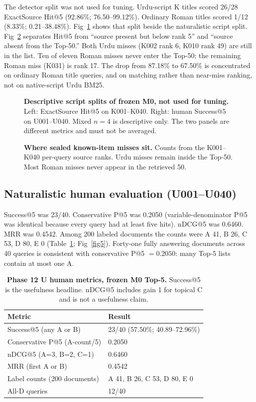 \documentclass[10pt,letterpaper]{article}
\begin{document}
The detector split was not used for tuning. Urdu-script K titles scored 26/28 ExactSource Hit@5 (92.86\%; 76.50--99.12\%). Ordinary Roman titles scored 1/12 (8.33\%; 0.21--38.48\%). Fig~\ref{fig3} shows that split beside the naturalistic script split. Fig~\ref{fig4} separates Hit@5 from ``source present but below rank 5'' and ``source absent from the Top-50.'' Both Urdu misses (K002 rank 6, K010 rank 49) are still in the list. Ten of eleven Roman misses never enter the Top-50; the remaining Roman miss (K031) is rank 17. The drop from 87.18\% to 67.50\% is concentrated on ordinary Roman title queries, and on matching rather than near-miss ranking, not on native-script Urdu BM25.

\begin{figure}[!h]
\caption{\textbf{Descriptive script splits of frozen M0, not used for tuning.} Left: ExactSource Hit@5 on K001--K040. Right: human Success@5 on U001--U040. Mixed $n = 4$ is descriptive only. The two panels are different metrics and must not be averaged.}
\label{fig3}
\end{figure}

\begin{figure}[!h]
\caption{\textbf{Where sealed known-item misses sit.} Counts from the K001--K040 per-query source ranks. Urdu misses remain inside the Top-50. Most Roman misses never appear in the retrieved 50.}
\label{fig4}
\end{figure}

\subsection*{Naturalistic human evaluation (U001--U040)}

Success@5 was 23/40. Conservative P@5 was 0.2050 (variable-denominator P@5 was identical because every query had at least five hits). nDCG@5 was 0.6460. MRR was 0.4542. Among 200 labeled documents the counts were A 41, B 26, C 53, D 80, E 0 (Table~\ref{table5}; Fig~\ref{fig5}). Forty-one fully answering documents across 40 queries is consistent with conservative P@5 $= 0.2050$: many Top-5 lists contain at most one A.

\begin{table}[!ht]
\centering
\caption{\textbf{Phase 12 U human metrics, frozen M0 Top-5.} Success@5 is the usefulness headline. nDCG@5 includes gain 1 for topical C and is not a usefulness claim.}
\begin{tabular}{|l|l|}
\hline
\textbf{Metric} & \textbf{Result} \\
\hline
Success@5 (any A or B) & 23/40 (57.50\%; 40.89--72.96\%) \\
\hline
Conservative P@5 (A-count/5) & 0.2050 \\
\hline
nDCG@5 (A=3, B=2, C=1) & 0.6460 \\
\hline
MRR (first A or B) & 0.4542 \\
\hline
Label counts (200 documents) & A 41, B 26, C 53, D 80, E 0 \\
\hline
All-D queries & 12/40 \\
\hline
\end{tabular}
\label{table5}
\end{table}
\end{document}
